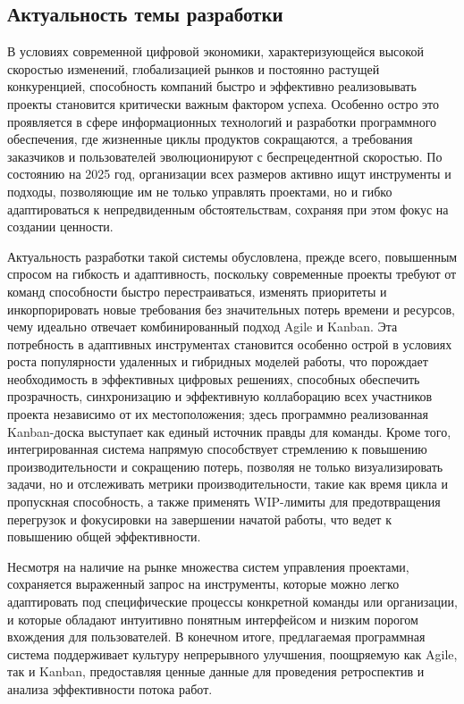 \subsection{Актуальность темы разработки}
В условиях современной цифровой экономики, характеризующейся высокой скоростью изменений, глобализацией рынков и постоянно растущей конкуренцией, способность компаний быстро и эффективно реализовывать проекты становится критически важным фактором успеха. Особенно остро это проявляется в сфере информационных технологий и разработки программного обеспечения, где жизненные циклы продуктов сокращаются, а требования заказчиков и пользователей эволюционируют с беспрецедентной скоростью. По состоянию на 2025 год, организации всех размеров активно ищут инструменты и подходы, позволяющие им не только управлять проектами, но и гибко адаптироваться к непредвиденным обстоятельствам, сохраняя при этом фокус на создании ценности.

Актуальность разработки такой системы обусловлена, прежде всего, повышенным спросом на гибкость и адаптивность, поскольку современные проекты требуют от команд способности быстро перестраиваться, изменять приоритеты и инкорпорировать новые требования без значительных потерь времени и ресурсов, чему идеально отвечает комбинированный подход Agile и Kanban. Эта потребность в адаптивных инструментах становится особенно острой в условиях роста популярности удаленных и гибридных моделей работы, что порождает необходимость в эффективных цифровых решениях, способных обеспечить прозрачность, синхронизацию и эффективную коллаборацию всех участников проекта независимо от их местоположения; здесь программно реализованная Kanban-доска выступает как единый источник правды для команды. Кроме того, интегрированная система напрямую способствует стремлению к повышению производительности и сокращению потерь, позволяя не только визуализировать задачи, но и отслеживать метрики производительности, такие как время цикла и пропускная способность, а также применять WIP-лимиты для предотвращения перегрузок и фокусировки на завершении начатой работы, что ведет к повышению общей эффективности. 

Несмотря на наличие на рынке множества систем управления проектами, сохраняется выраженный запрос на инструменты, которые можно легко адаптировать под специфические процессы конкретной команды или организации, и которые обладают интуитивно понятным интерфейсом и низким порогом вхождения для пользователей. В конечном итоге, предлагаемая программная система поддерживает культуру непрерывного улучшения, поощряемую как Agile, так и Kanban, предоставляя ценные данные для проведения ретроспектив и анализа эффективности потока работ.
